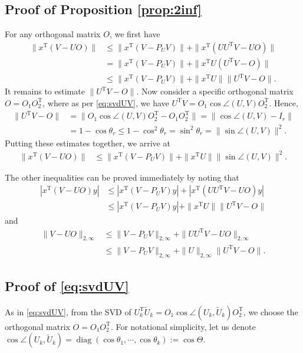 \documentclass[reqno]{amsart}
\DeclareMathOperator{\diag}{diag}
\newcommand{\T}{\mathrm{T}}
\theoremstyle{plain}
\theoremstyle{definition}
\begin{document}
\subsection{Proof of Proposition \ref{prop:2inf}}\label{app:2inf}
For any orthogonal matrix $O$, we first have
\begin{align*}
\|x^\T (V- UO) \| &\le \|x^\T (V - P_U V)\| + \| x^\T (U U^\T V - UO)\|\\
&=\|x^\T (V - P_U V)\| + \| x^\T U ( U^\T V - O)\|\\
&\le \|x^\T (V - P_U V)\| + \| x^\T U\| \| U^\T V - O\|.
\end{align*}
It remains to estimate $\| U^\T V - O\|$. Now consider a specific orthogonal matrix $O=O_1 O_2^\T$, where as per \eqref{eq:svdUV}, we have $U^\T V = O_1 \cos\angle(U,V) O_2^\T$.  Hence,
\begin{align*}
\| U^\T V - O\| &= \| O_1 \cos\angle(U,V) O_2^\T - O_1 O_2^\T\| = \|\cos\angle(U,V)-I_r\|\\
&=1-\cos\theta_r\le 1-\cos^2\theta_r = \sin^2\theta_r = \|\sin\angle(U, V)\|^2.
\end{align*}
Putting these estimates together, we arrive at 
\begin{align*}
\|x^\T (V- UO) \| &\le \|x^\T (V - P_U V)\| + \| x^\T U\| \|\sin\angle(U, V)\|^2.
\end{align*}

The other inequalities can be proved immediately by noting that
\begin{align*}
\left|x^\T (V- UO) y \right| &\le \left|x^\T (V- P_U V) y \right| + \left|x^\T (UU^\T V- UO) y \right|\\
&\le \left|x^\T (V- P_U V) y \right| + \|x^\T U\| \|U^\T V- O\|
\end{align*}
and
\begin{align*}
\|V- UO\|_{2,\infty} &\le \|V - P_U V\|_{2,\infty} +\|UU^\T V- UO\|_{2,\infty}\\
&\le \|V - P_U V\|_{2,\infty} +\|U\|_{2,\infty} \|U^\T V- O\|.
\end{align*}


\subsection{Proof of \eqref{eq:svdUV}}\label{app:eq:weightedbdnew}
As in \eqref{eq:svdUV}, from the SVD of ${U}_k^\T \widetilde{U}_{k} = O_1 \cos\angle(U_k, \widetilde{U}_{k}) O_2^\T$, we choose the orthogonal matrix $O=O_1 O_2^\T$. For notational simplicity, let us denote $\cos\angle(U_k, \widetilde{U}_{k}) =\diag(\cos\theta_1,\cdots,\cos\theta_k):= \cos \Theta$. 
\end{document}
